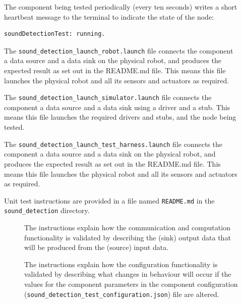 \documentclass{CSSRforAfrica}
\newcommand{\checkboxChecked}{\fbox{\ding{51}}} %
\newcommand{\checkboxDashed}{\fbox{--}}         %
\begin{document}
\begin{description}
\item[\checkboxChecked]   The component being tested periodically (every ten seconds) writes a short heartbeat message to the terminal to indicate the state of the node:
{\small 
\begin{verbatim}
soundDetectionTest: running.
\end{verbatim}}

\item[\checkboxChecked] The {\small \verb+sound_detection_launch_robot.launch+} file connects the component a data source and a data sink on the physical robot, and produces the expected result as set out in the README.md file. This means this file launches the physical robot and all its sensors and actuators as required.

\item[\checkboxDashed]   The {\small \verb+sound_detection_launch_simulator.launch+} file connects the component a data source and a data sink using a driver and a stub. This means this file launches the required drivers and stubs, and the node being tested.

\item[\checkboxChecked]   The {\small \verb+sound_detection_launch_test_harness.launch+} file connects the component a data source and a data sink on the physical robot, and produces the expected result as set out in the README.md file. This means this file launches the physical robot and all its sensors and actuators as required.

\item[\checkboxChecked] Unit test instructions are provided in a file named {\small \verb+README.md+} in the  {\small \verb+sound_detection+} directory. 


\begin{description}

\item[\checkboxChecked] The instructions explain how the communication and computation functionality is validated by describing the (sink) output data that will be produced from the (source) input data.  

\item[\checkboxChecked] The instructions explain how the configuration functionality is validated by describing what changes in behaviour will occur if the values for the component parameters in the component configuration ({\small \verb+sound_detection_test_configuration.json+}) file are altered.

\end{description}
\end{description}
\newpage
\end{document}
